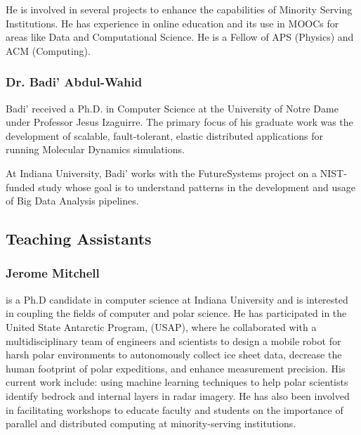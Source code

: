 He is involved in several projects to enhance the capabilities of
Minority Serving Institutions. He has experience in online education
and its use in MOOCs for areas like Data and Computational Science. He
is a Fellow of APS (Physics) and ACM (Computing).


\subsubsection{Dr. Badi' Abdul-Wahid}
\label{\detokenize{i524/preface/instructors:dr-badi-abdul-wahid}}
\noindent{}

Badi' received a Ph.D. in Computer Science at the University of Notre
Dame under Professor Jesus Izaguirre. The primary focus of his
graduate work was the development of scalable, fault-tolerant, elastic
distributed applications for running Molecular Dynamics simulations.

At Indiana University, Badi' works with the FutureSystems project
on a NIST-funded study whose goal is to understand patterns in the
development and usage of Big Data Analysis pipelines.


\subsection{Teaching Assistants}
\label{\detokenize{i524/preface/instructors:teaching-assistants}}

\subsubsection{Jerome Mitchell}
\label{\detokenize{i524/preface/instructors:jerome-mitchell}}
\noindent{}

 is a Ph.D candidate in computer science at Indiana
University and is interested in coupling the fields of computer and
polar science. He has participated in the United State Antarctic
Program, (USAP), where he collaborated with a multidisciplinary team
of engineers and scientists to design a mobile robot for harsh polar
environments to autonomously collect ice sheet data, decrease the
human footprint of polar expeditions, and enhance measurement
precision. His current work include: using machine learning techniques
to help polar scientists identify bedrock and internal layers in radar
imagery. He has also been involved in facilitating workshops to
educate faculty and students on the importance of parallel and
distributed computing at minority-serving institutions.


